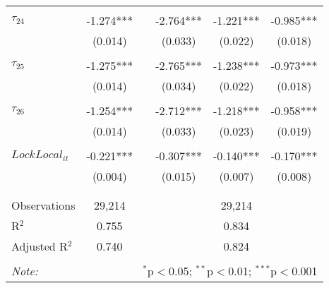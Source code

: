 \begin{tabular}{@{\extracolsep{-0pt}}lccccc}
                &           &&           &           &           \\[-2.1ex]
$\tau_{24}$     & -1.274*** && -2.764*** & -1.221*** & -0.985*** \\
                &  (0.014)  &&  (0.033)  &  (0.022)  &  (0.018)  \\
                &           &&           &           &           \\[-2.1ex]
$\tau_{25}$     & -1.275*** && -2.765*** & -1.238*** & -0.973*** \\
                &  (0.014)  &&  (0.034)  &  (0.022)  &  (0.018)  \\
                &           &&           &           &           \\[-2.1ex]
$\tau_{26}$     & -1.254*** && -2.712*** & -1.218*** & -0.958*** \\
                &  (0.014)  &&  (0.033)  &  (0.023)  &  (0.019)  \\
                &           &&           &           &           \\[-1.ex]
$LockLocal_{it}$ & -0.221*** && -0.307*** & -0.140*** & -0.170*** \\
                &  (0.004)  &&  (0.015)  &  (0.007)  &  (0.008)  \\
                &           &&           &           &           \\[-2.1ex]

\hline \\[-1.8ex] 
Observations     & 29,214 && \multicolumn{3}{c}{29,214} \\ 
R$^{2}$          & 0.755  && \multicolumn{3}{c}{ 0.834} \\ 
Adjusted R$^{2}$ & 0.740  && \multicolumn{3}{c}{ 0.824} \\ 
\hline 
\hline \\[-1.8ex] 
\textit{Note:}  & \multicolumn{5}{r}{$^{*}$p$<$0.05; $^{**}$p$<$0.01; $^{***}$p$<$0.001} \\ 
\end{tabular} 